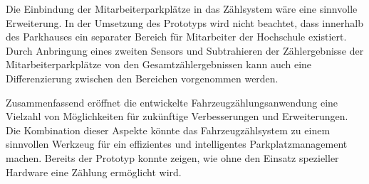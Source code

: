 Die Einbindung der Mitarbeiterparkplätze in das Zählsystem wäre eine sinnvolle Erweiterung.
In der Umsetzung des Prototyps wird nicht beachtet, dass innerhalb des Parkhauses ein separater Bereich für Mitarbeiter der Hochschule existiert.
Durch Anbringung eines zweiten Sensors und Subtrahieren der Zählergebnisse der Mitarbeiterparkplätze von den Gesamtzählergebnissen kann auch eine Differenzierung zwischen den Bereichen vorgenommen werden.

Zusammenfassend eröffnet die entwickelte Fahrzeugzählungsanwendung eine Vielzahl von Möglichkeiten für zukünftige Verbesserungen und Erweiterungen.
Die Kombination dieser Aspekte könnte das Fahrzeugzählsystem zu einem sinnvollen Werkzeug für ein effizientes und intelligentes Parkplatzmanagement machen.
Bereits der Prototyp konnte zeigen, wie ohne den Einsatz spezieller Hardware eine Zählung ermöglicht wird.
